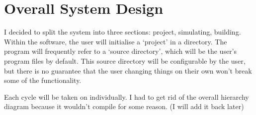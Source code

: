 \chapter{Overall System Design}
    I decided to split the system into three sections: project, simulating, building. Within the software, the user will initialise a `project' in a directory. 
    The program will frequently refer to a `source directory', which will be the user's program files by default. 
    This source directory will be configurable by the user, but there is no guarantee that the user changing things on their own won't break some of the functionality.


Each cycle will be taken on individually. I had to get rid of the overall hierarchy diagram because it wouldn't compile for some reason. (I will add it back later)